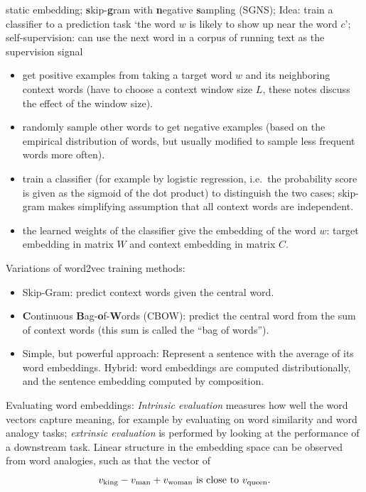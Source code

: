 \documentclass[11pt, a4paper]{amsart}
\begin{document}
{
	\color{blue}
	
	static embedding;
	\textbf{s}kip-\textbf{g}ram with \textbf{n}egative \textbf{s}ampling (SGNS);
	Idea: train a classifier to a prediction task `the word $w$ is likely to show up near the word $c$';
	self-supervision: can use the next word in a corpus of running text as the supervision signal
	\begin{itemize}
		\item get positive examples from taking a target word $w$ and its neighboring context words (have to choose a context window size $L$, these notes \cite{DBLP:journals/corr/Goldberg15c} discuss the effect of the window size).
		\item randomly sample other words to get negative examples (based on the empirical distribution of words, but usually modified to sample less frequent words more often).
		\item train a classifier (for example by logistic regression, i.e.\ the probability score is given as the sigmoid of the dot product) to distinguish the two cases;
		skip-gram makes simplifying assumption that all context words are independent.
		\item the learned weights of the classifier give the embedding of the word $w$:
		target embedding in matrix $W$ and context embedding in matrix $C$.
	\end{itemize}
	Variations of word2vec training methods:
	\begin{itemize}
		\item Skip-Gram:
		predict context words given the central word.
		\item \textbf{C}ontinuous \textbf{B}ag-\textbf{o}f-\textbf{W}ords (CBOW):
		predict the central word from the sum of context words (this sum is called the ``bag of words'').
		\item Simple, but powerful approach:
		Represent a sentence with the average of its word embeddings.
		Hybrid: word embeddings are computed distributionally, and the sentence embedding computed by composition.
	\end{itemize}
	
	Evaluating word embeddings:
	\emph{Intrinsic evaluation} measures how well the word vectors capture meaning, for example by evaluating on word similarity and word analogy tasks;
	\emph{extrinsic evaluation} is performed by looking at the performance of a downstream task.
	Linear structure in the embedding space can be observed from word analogies, such as that the vector of
	\[
	v_{\textup{king}} - v_{\textup{man}} + v_{\textup{woman}} \text{ is close to } v_{\textup{queen}}.
	\]
} %
\end{document}

